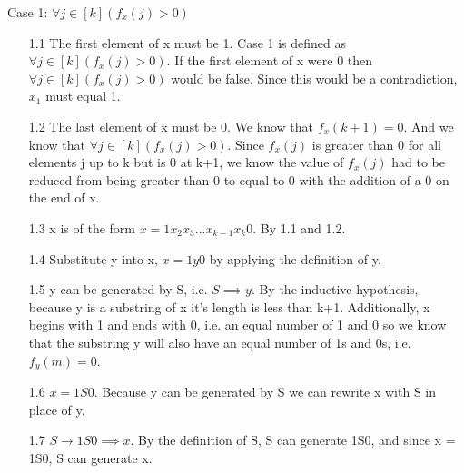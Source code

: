 \documentclass[11pt]{article}
\def\imp{\rightarrow}
\begin{document}
\begin{enumerate}
	Case 1: $\forall j \in [k] (f_x(j) > 0)$
	\begin{enumerate}
		\item[1.1] The first element of x must be 1. Case 1 is defined as $\forall j \in [k] (f_x(j) > 0)$. If the first element of x were 0 then $\forall j \in [k] (f_x(j) > 0)$ would be false. Since this would be a contradiction, $x_1$ must equal 1. 
		\item[1.2] The last element of x must be 0. We know that $f_x(k+1)=0$. And we know that $\forall j \in [k] (f_x(j) > 0)$. Since $f_x(j)$ is greater than 0 for all elements j up to k but is 0 at k+1, we know the value of $f_x(j)$ had to be reduced from being greater than 0 to equal to 0 with the addition of a 0 on the end of x. 
		\item[1.3] x is of the form $x=1 x_2 x_3 ... x_{k-1} x_k 0$. By 1.1 and 1.2.  
		\item[1.4] Substitute y into x, $x=1y0$ by applying the definition of y.  
		\item[1.5] y can be generated by S, i.e. $S \implies y$. By the inductive hypothesis, because y is a substring of x it's length is less than k+1. Additionally, x begins with 1 and ends with 0, i.e. an equal number of 1 and 0 so we know that the substring y will also have an equal number of 1s and 0s, i.e. $f_y(m)=0$. 
		\item[1.6] $x=1S0$. Because y can be generated by S we can rewrite x with S in place of y. 
		\item[1.7] $S \imp 1S0 \implies x$. By the definition of S, S can generate 1S0, and since x = 1S0, S can generate x. 
	\end{enumerate}
	

\end{enumerate}
\end{document}
